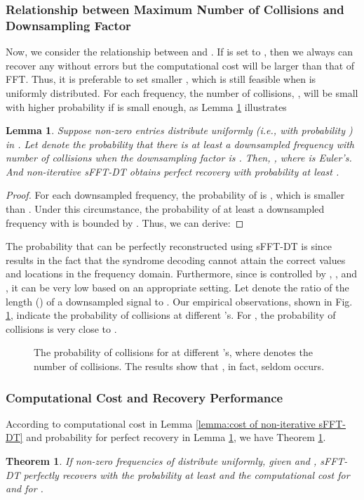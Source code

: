 \documentclass[journal,onecolumn,11pt]{IEEEtran}
\newtheorem{theorem}{Theorem}
\newtheorem{lemma}{Lemma}
\begin{document}
\subsubsection{Relationship between Maximum Number of Collisions and Downsampling Factor}
Now, we consider the relationship between  and .
If  is set to , then we always can recover any  without errors but the computational cost
will be larger than that of FFT.
Thus, it is preferable to set smaller , which is still feasible when  is uniformly distributed.
For each frequency, the number of collisions, , will be small with higher probability if  is small enough, as Lemma \ref{lemma:probability of bin} illustrates
\begin{lemma}
\label{lemma:probability of bin}
Suppose  non-zero entries distribute uniformly ({\em i.e.}, with probability ) in .
Let  denote the probability that there is at least a downsampled frequency with number of collisions  when the downsampling factor is .
Then, , where  is Euler's.
And non-iterative sFFT-DT obtains perfect recovery with probability at least .
\end{lemma}

\begin{proof}
For each downsampled frequency, the probability of  is , which is smaller than .
Under this circumstance, the probability of at least a downsampled frequency with  is  bounded  by .
Thus, we can derive:
\small

\end{proof}
\normalsize
The probability that  can be perfectly reconstructed using sFFT-DT is  since  results in the fact that the syndrome decoding cannot attain the correct values and locations in the frequency domain.
Furthermore, since  is controlled by , , and , it can be very low based on an appropriate setting.
Let  denote the ratio of the length () of a downsampled signal to .
Our empirical observations, shown in Fig. \ref{fig:aliasing}, indicate the probability of collisions at different 's.
For , the probability of collisions is very close to .
\begin{figure}[h]
\hfill
\caption{The probability of collisions for  at different 's, where  denotes the number of collisions. The results show that , in fact, seldom occurs.}
\label{fig:aliasing}
\end{figure}


\subsubsection{Computational Cost and Recovery Performance}
According to computational cost in Lemma \ref{lemma:cost of non-iterative sFFT-DT} and probability for perfect recovery in Lemma \ref{lemma:probability of bin}, we have Theorem \ref{theorem:probability of sfftdt v1}.
\begin{theorem}
\label{theorem:probability of sfftdt v1}
If non-zero frequencies of  distribute uniformly, given  and , sFFT-DT perfectly recovers  with the probability at least  and the computational cost  for  and  for .
\end{theorem}
\end{document}
